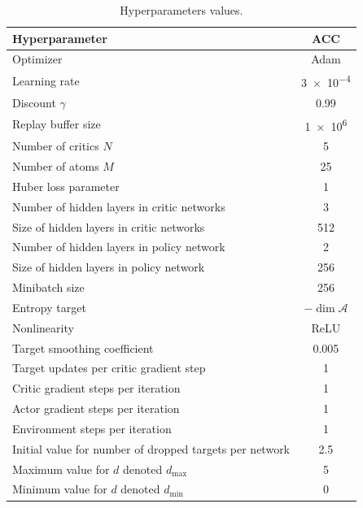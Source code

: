 \begin{table}[t]
\caption{Hyperparameters values.}
\label{tab:hyperparameter}
\vskip 0.15in
\begin{center}
\begin{small}
\begin{sc}
\begin{tabular}{lccc}
\toprule
Hyperparameter & \multicolumn{3}{c}{ACC} \\
\midrule
Optimizer & \multicolumn{3}{c}{Adam} \\
Learning rate & \multicolumn{3}{c}{\num{3e-4}} \\
Discount $\gamma$ & \multicolumn{3}{c}{0.99} \\
Replay buffer size & \multicolumn{3}{c}{\num{1e6}} \\
Number of critics $N$ & \multicolumn{3}{c}{5} \\
Number of atoms $M$ & \multicolumn{3}{c}{25}\\
Huber loss parameter  & \multicolumn{3}{c}{1} \\
Number of hidden layers in critic networks & \multicolumn{3}{c}{3}\\
Size of hidden layers in critic networks & \multicolumn{3}{c}{512} \\
Number of hidden layers in policy network & \multicolumn{3}{c}{2} \\
Size of hidden layers in policy network & \multicolumn{3}{c}{256} \\
Minibatch size & \multicolumn{3}{c}{256} \\
Entropy target  &  \multicolumn{3}{c}{$- \dim \mathcal{A}$} \\
Nonlinearity & \multicolumn{3}{c}{ReLU} \\
Target smoothing coefficient  & \multicolumn{3}{c}{0.005} \\
Target updates per critic gradient step & \multicolumn{3}{c}{1} \\
Critic gradient steps per iteration & \multicolumn{3}{c}{1} \\
Actor gradient steps per iteration & \multicolumn{3}{c}{1} \\
Environment steps per iteration & \multicolumn{3}{c}{1} \\
\midrule
Initial value for number of dropped targets per network & \multicolumn{3}{c}{2.5} \\
Maximum value for $d$ denoted $d_{\max}$ & \multicolumn{3}{c}{5} \\
Minimum value for $d$ denoted $d_{\min}$ & \multicolumn{3}{c}{0} \\

\end{tabular}
\end{sc}
\end{small}
\end{center}
\end{table}
